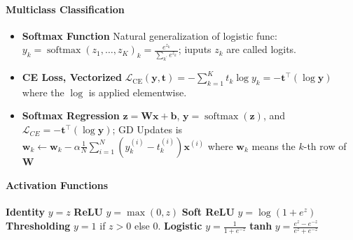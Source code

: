 \documentclass[10pt]{article}
\newcommand{\bb}{\mathbf{b}}
\newcommand{\bw}{\mathbf{w}}
\newcommand{\bx}{\mathbf{x}}
\newcommand{\by}{\mathbf{y}}
\newcommand{\bz}{\mathbf{z}}
\begin{document}
\paragraph{Multiclass Classification}
\begin{itemize}
    \setlength\itemsep{-0.45em}
    \item \textbf{Softmax Function} Natural generalization of logistic func: $y_{k}=\operatorname{softmax}\left(z_{1}, \ldots, z_{K}\right)_{k}=\frac{e^{z_{k}}}{\sum_{k^{\prime}} e^{z_{k^{\prime}}}}$; iuputs $z_k$ are called logits. 
    \item \textbf{CE Loss, Vectorized} $\mathcal{L}_{\mathrm{CE}}(\mathbf{y}, \mathbf{t})=-\sum_{k=1}^{K} t_{k} \log y_{k} =-\mathbf{t}^{\top}(\log \mathbf{y})$ where the $\log $ is applied elementwise.
    \item \textbf{Softmax Regression} $\bz = \mathbf{W}\bx + \bb$, $\by = \operatorname{softmax}(\bz)$, and $\mathcal{L}_{CE} = -\mathbf{t}^{\top}(\log \mathbf{y})$; GD Updates is $\mathbf{w}_{k} \leftarrow \mathbf{w}_{k}-\alpha \frac{1}{N} \sum_{i=1}^{N}\left(y_{k}^{(i)}-t_{k}^{(i)}\right) \mathbf{x}^{(i)}$ where $\bw_k$ means the $k$-th row of $\mathbf{W}$
\end{itemize}

\paragraph{Activation Functions} \textbf{Identity} $y = z$ \textbf{ReLU} $y = \max (0, z)$ \textbf{Soft ReLU} $y = \log(1+e^z)$ \textbf{Thresholding} $y = 1$ if $z> 0$ else $0$. \textbf{Logistic} $y=\frac{1}{1+e^{-z}}$ \textbf{tanh} $y=\frac{e^{z}-e^{-z}}{e^{z}+e^{-z}}$
\end{document}
